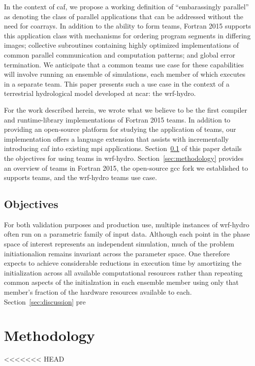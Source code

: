 In the context of \gls{caf}, we propose a working definition of ``embarassingly parallel'' as denoting the class of parallel
applications that can be addressed without the need for \glspl{coarray}.  In addition to the ability to form teams, Fortran
2015 supports this application class with mechanisms for ordering program segments in differing images; collective subroutines
containing highly optimized implementations of common parallel communication and computation patterns; and global error
termination.  We anticipate that a common teams use case for these capabilities will involve running an ensemble of simulations,
each member of which executes in a separate team.  This paper presents such a use case in the context of a terrestrial
hydrological model developed at \gls{ncar}: the \gls{wrf-hydro}.

For the work described herein, we wrote what we believe to be the first compiler and runtime-library implementations of Fortran
2015 teams.  In addition to providing an open-source platform for studying the application of teams, our implementation offers a
language extension that assists with incrementally introducing \gls{caf} into existing \gls{mpi} applications.
Section~\ref{sec:objectives} of this paper details the objectives for using teams in \gls{wrf-hydro}.
Section~\ref{sec:methodology} provides an overview of teams in Fortran 2015, the open-source \gls{gcc} fork we established to
supports teams, and the \gls{wrf-hydro} teams use case.

\subsection{Objectives}\label{sec:objectives}
For both validation purposes and production use, multiple instances of \gls{wrf-hydro} often run on a parametric family of
input data.  Although each point in the phase space of interest represents an independent simulation, much of the problem
initiationalion remains invariant across the parameter space.  One therefore expects to achieve considerable reductions in
execution time by amortizing the initialization across all available computational resources rather than repeating common
aspects of the initialzation in each ensemble member using only that member's fraction of the hardware resources available to
each. Section~\ref{sec:discussion} pre

\section{Methodology}
<<<<<<< HEAD
